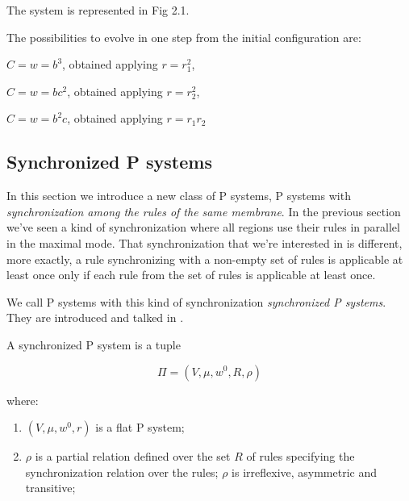 The system is represented in Fig 2.1.

\begin{figure}[h]
\centering


\caption{}
\label{}
\end{figure}

The possibilities to evolve in one step from the initial configuration are: 
\begin{description}
    \item $C=w=b^3$, obtained applying $r=r_1^2$,
    \item $C=w=bc^2$, obtained applying $r=r_2^2$,
    \item $C=w=b^2c$, obtained applying $r=r_1 r_2$
\end{description}

\subsection{Synchronized P systems}

In this section we introduce a new class of P systems, P systems with \textit{synchronization among the rules of the same membrane}.
In the previous section we've seen a kind of synchronization where all regions use their rules in parallel in the maximal mode.
That synchronization that we're interested in is different, more exactly, a rule synchronizing with a non-empty set of rules is applicable at least once only if each rule from the set of rules is applicable at least once.

We call P systems with this kind of synchronization \textit{synchronized P systems}.
They are introduced and talked in \cite{aman2019synchronization,aman2022power}.

\begin{definition}
A synchronized P system is a tuple

\[ \Pi = (V,\mu,w^0,R,\rho) \]

where:
\begin{enumerate}
    \item $(V,\mu,w^0,r)$ is a flat P system;    
    \item $\rho$ is a partial relation defined over the set $R$ of rules specifying
    the synchronization relation over the rules;
    $\rho$ is irreflexive, asymmetric and transitive;
\end{enumerate}
\end{definition}

